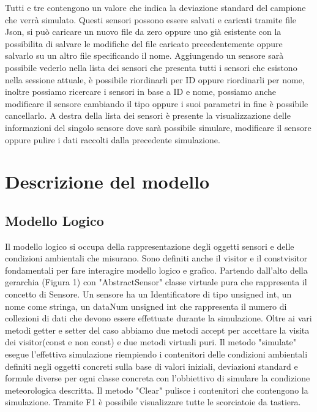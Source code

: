 \documentclass{article}
\begin{document}
Tutti e tre contengono un valore che indica la deviazione standard del campione che verrà simulato. Questi sensori possono essere salvati e caricati tramite file Json, si può caricare un nuovo file da zero oppure uno già esistente con la possibilita di salvare le modifiche del file caricato precedentemente oppure salvarlo su un altro file specificando il nome.
Aggiungendo un sensore sarà possibile vederlo nella lista dei sensori che presenta tutti i sensori che esistono nella sessione attuale, è possibile riordinarli per ID oppure riordinarli per nome, inoltre possiamo ricercare i sensori in base a ID e nome, possiamo anche modificare il sensore cambiando il tipo oppure i suoi parametri in fine è possibile cancellarlo.
A destra della lista dei sensori è presente la visualizzazione delle informazioni del singolo sensore dove sarà possibile simulare, modificare il sensore oppure pulire i dati raccolti dalla precedente simulazione. 

\section{Descrizione del modello}
\subsection{Modello Logico}
Il modello logico si occupa della rappresentazione degli oggetti sensori e delle condizioni ambientali che misurano. Sono definiti anche il visitor e il constvisitor fondamentali per fare interagire modello logico e grafico.
Partendo dall'alto della gerarchia (Figura 1) con "AbstractSensor" classe virtuale pura che rappresenta il concetto di Sensore. Un sensore ha un Identificatore di tipo unsigned int, un nome come stringa, un dataNum unsigned int che rappresenta il numero di collezioni di dati che devono essere effettuate durante la simulazione. Oltre ai vari metodi getter e setter del caso abbiamo due metodi accept per accettare la visita dei visitor(const e non const) e due metodi virtuali puri. Il metodo "simulate" esegue l'effettiva simulazione riempiendo i contenitori delle condizioni ambientali definiti negli oggetti concreti sulla base di valori iniziali, deviazioni standard e formule diverse per ogni classe concreta con l'obbiettivo di simulare la condizione meteorologica descritta. Il metodo "Clear" pulisce i contenitori che contengono la simulazione. Tramite F1 è possibile visualizzare tutte le scorciatoie da tastiera.
\end{document}

